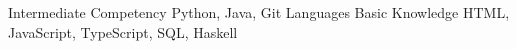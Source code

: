 \begin{cvhonors}
  \cvhonor
    {Intermediate Competency}
    {Python, Java, Git}
    {}
    {Languages}
  \cvhonor
    {Basic Knowledge}
    {HTML, JavaScript, TypeScript, SQL, Haskell}
    {}
    {}
\end{cvhonors}